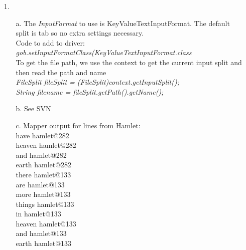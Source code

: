 \documentclass{article}
\begin{document}
\begin{itemize}
\item[1.] 
	\begin{itemize}
		\item[a.] The \textit{InputFormat} to use is KeyValueTextInputFormat. The default split is tab so no extra settings necessary.\\
			Code to add to driver: \textit{gob.setInputFormatClass(KeyValueTextInputFormat.class}\\
			To get the file path, we use the context to get the current input split and then read the path and name\\
			\textit{FileSplit fileSplit = (FileSplit)context.getInputSplit();}\\
			\textit{String filename = fileSplit.getPath().getName();}\\
		\item[b.] See SVN
		\item[c.] Mapper output for lines from Hamlet:\\
			have	hamlet@282\\
			heaven	hamlet@282\\
			and	hamlet@282\\
			earth	hamlet@282\\
			there	hamlet@133\\
			are	hamlet@133\\
			more	hamlet@133\\
			things	hamlet@133\\
			in	hamlet@133\\
			heaven	hamlet@133\\
			and	hamlet@133\\
			earth	hamlet@133\\
	\end{itemize}


\end{itemize}
\end{document}
